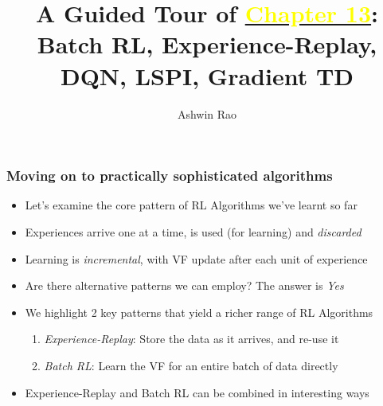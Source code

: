 \documentclass[handout]{beamer}
\title[Batch RL Chapter]{A Guided Tour of \href{http://stanford.edu/~ashlearn/RLForFinanceBook/book.pdf}{\underline{\textcolor{yellow}{Chapter 13}}}: \\ Batch RL, Experience-Replay, DQN, LSPI, Gradient TD} %
\author{Ashwin Rao} %
\institute[Stanford] %
{ICME, Stanford University
}
\date %
\begin{document}
\lstset{language=Python}  
\begin{frame}
\titlepage %
\end{frame}


\begin{frame}
\frametitle{Moving on to practically sophisticated algorithms}
\begin{itemize}[<+->]
\item Let's examine the core pattern of RL Algorithms we've learnt so far
\item Experiences arrive one at a time, is used (for learning) and {\em discarded}
\item Learning is {\em incremental}, with VF update after each unit of experience
\item Are there alternative patterns we can employ? The answer is {\em Yes}
\item We highlight 2 key patterns that yield a richer range of RL Algorithms
\begin{enumerate}[<+->]
\item {\em Experience-Replay}: Store the data as it arrives, and re-use it
\item {\em Batch RL}: Learn the VF for an entire batch of data directly
\end{enumerate} 
\item Experience-Replay and Batch RL can be combined in interesting ways
\end{itemize}
\end{frame}
\end{document}
